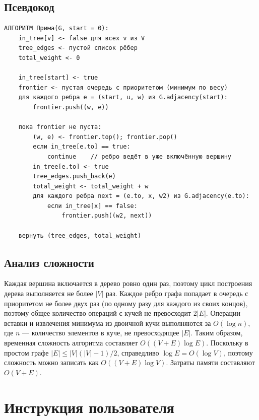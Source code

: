 \documentclass[a4paper,14pt]{extarticle}
\begin{document}
\subsection{Псевдокод}

\begin{lstlisting}[caption={Псевдокод алгоритма Прима},label=lst:prim]
АЛГОРИТМ Прима(G, start = 0):
    in_tree[v] <- false для всех v из V
    tree_edges <- пустой список рёбер
    total_weight <- 0

    in_tree[start] <- true
    frontier <- пустая очередь с приоритетом (минимум по весу)
    для каждого ребра e = (start, u, w) из G.adjacency(start):
        frontier.push((w, e))

    пока frontier не пуста:
        (w, e) <- frontier.top(); frontier.pop()
        если in_tree[e.to] == true:
            continue    // ребро ведёт в уже включённую вершину
        in_tree[e.to] <- true
        tree_edges.push_back(e)
        total_weight <- total_weight + w
        для каждого ребра next = (e.to, x, w2) из G.adjacency(e.to):
            если in_tree[x] == false:
                frontier.push((w2, next))

    вернуть (tree_edges, total_weight)
\end{lstlisting}

\subsection{Анализ сложности}

Каждая вершина включается в дерево ровно один раз, поэтому цикл построения
дерева выполняется не более $|V|$ раз. Каждое ребро графа попадает в очередь
с приоритетом не более двух раз (по одному разу для каждого из своих концов),
поэтому общее количество операций с кучей не превосходит $2|E|$. Операции
вставки и извлечения минимума из двоичной кучи выполняются за $O(\log n)$, где
$n$ --- количество элементов в куче, не превосходящее $|E|$. Таким образом,
временная сложность алгоритма составляет $O((V+E)\log E)$. Поскольку в
простом графе $|E| \le |V|(|V|-1)/2$, справедливо $\log E = O(\log V)$,
поэтому сложность можно записать как $O((V+E)\log V)$. Затраты памяти
составляют $O(V+E)$.

\section{Инструкция пользователя}
\end{document}
